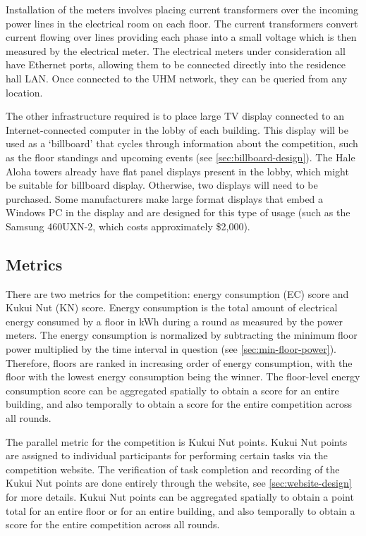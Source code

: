 Installation of the meters involves placing current transformers over the incoming power lines in the electrical room on each floor. The current transformers convert current flowing over lines providing each phase into a small voltage which is then measured by the electrical meter. The electrical meters under consideration all have Ethernet ports, allowing them to be connected directly into the residence hall LAN. Once connected to the UHM network, they can be queried from any location.

The other infrastructure required is to place large TV display connected to an Internet-connected computer in the lobby of each building. This display will be used as a `billboard' that cycles through information about the competition, such as the floor standings and upcoming events (see \autoref{sec:billboard-design}). The Hale Aloha towers already have flat panel displays present in the lobby, which might be suitable for billboard display. Otherwise, two displays will need to be purchased. Some manufacturers make large format displays that embed a Windows PC in the display and are designed for this type of usage (such as the Samsung 460UXN-2, which costs approximately \$2,000).

\subsection{Metrics}

There are two metrics for the competition: energy consumption (EC) score and Kukui Nut (KN) score. Energy consumption is the total amount of electrical energy consumed by a floor in kWh during a round as measured by the power meters. The energy consumption is normalized by subtracting the minimum floor power multiplied by the time interval in question (see \autoref{sec:min-floor-power}). Therefore, floors are ranked in increasing order of energy consumption, with the floor with the lowest energy consumption being the winner. The floor-level energy consumption score can be aggregated spatially to obtain a score for an entire building, and also temporally to obtain a score for the entire competition across all rounds.

The parallel metric for the competition is Kukui Nut points. Kukui Nut points are assigned to individual participants for performing certain tasks via the competition website. The verification of task completion and recording of the Kukui Nut points are done entirely through the website, see \autoref{sec:website-design} for more details. Kukui Nut points can be aggregated spatially to obtain a point total for an entire floor or for an entire building, and also temporally to obtain a score for the entire competition across all rounds.

